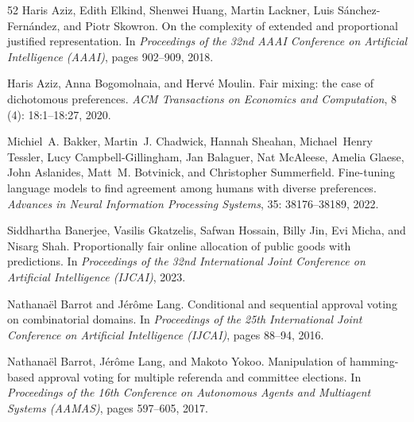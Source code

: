 \documentclass[10pt]{scrartcl}
\theoremstyle{plain}
\theoremstyle{definition}
\begin{document}
\begin{thebibliography}{52}
	Haris Aziz, Edith Elkind, Shenwei Huang, Martin Lackner, Luis
	S{\'a}nchez-Fern{\'a}ndez, and Piotr Skowron.
	\newblock On the complexity of extended and proportional justified
	representation.
	\newblock In \emph{Proceedings of the 32nd AAAI Conference on Artificial
		Intelligence (AAAI)}, pages 902--909, 2018.
	
	Haris Aziz, Anna Bogomolnaia, and Herv\'{e} Moulin.
	\newblock Fair mixing: the case of dichotomous preferences.
	\newblock \emph{ACM Transactions on Economics and Computation}, 8
	(4): 18:1--18:27, 2020.
	
	Michiel~A. Bakker, Martin~J. Chadwick, Hannah Sheahan, Michael~Henry Tessler,
	Lucy Campbell{-}Gillingham, Jan Balaguer, Nat McAleese, Amelia Glaese, John
	Aslanides, Matt~M. Botvinick, and Christopher Summerfield.
	\newblock Fine-tuning language models to find agreement among humans with
	diverse preferences.
	\newblock \emph{Advances in Neural Information Processing Systems},
	35: 38176--38189, 2022.
	
	Siddhartha Banerjee, Vasilis Gkatzelis, Safwan Hossain, Billy Jin, Evi Micha,
	and Nisarg Shah.
	\newblock Proportionally fair online allocation of public goods with
	predictions.
	\newblock In \emph{Proceedings of the 32nd International Joint Conference on
		Artificial Intelligence (IJCAI)}, 2023.
	
	Nathana{\"e}l Barrot and J{\'e}r{\^o}me Lang.
	\newblock Conditional and sequential approval voting on combinatorial domains.
	\newblock In \emph{Proceedings of the 25th International Joint Conference on
		Artificial Intelligence (IJCAI)}, pages 88--94, 2016.
	
	Nathana{\"e}l Barrot, J{\'e}r{\^o}me Lang, and Makoto Yokoo.
	\newblock Manipulation of hamming-based approval voting for multiple referenda
	and committee elections.
	\newblock In \emph{Proceedings of the 16th Conference on Autonomous Agents and
		Multiagent Systems (AAMAS)}, pages 597--605, 2017.
	

\end{thebibliography}
\end{document}
